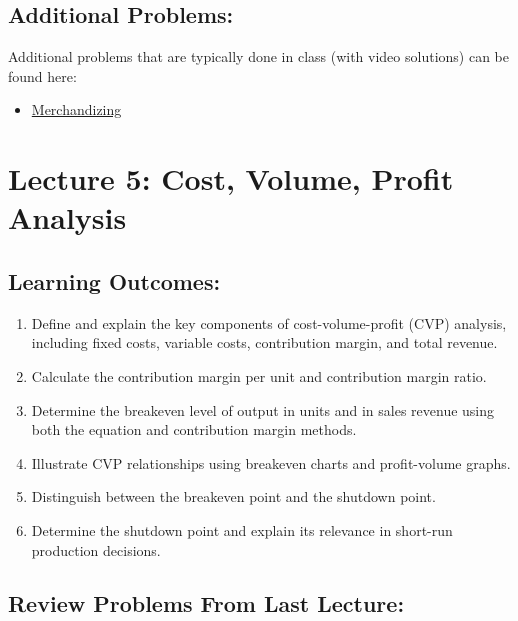 \documentclass[
]{book}
\providecommand{\tightlist}{%
  \setlength{\itemsep}{0pt}\setlength{\parskip}{0pt}}
\begin{document}
\subsection*{Additional Problems:}\label{additional-problems-3}

Additional problems that are typically done in class (with video solutions) can be found here:

\begin{itemize}
\tightlist
\item
  \href{https://theelementsmath.github.io/M114/business-economics.html\#merchandizing}{Merchandizing}
\end{itemize}

\section*{Lecture 5: Cost, Volume, Profit Analysis}\label{lecture-5-cost-volume-profit-analysis}

\subsection*{Learning Outcomes:}\label{learning-outcomes-4}

\begin{enumerate}
\def\labelenumi{\arabic{enumi}.}
\tightlist
\item
  Define and explain the key components of cost-volume-profit (CVP) analysis, including fixed costs, variable costs, contribution margin, and total revenue.
\item
  Calculate the contribution margin per unit and contribution margin ratio.
\item
  Determine the breakeven level of output in units and in sales revenue using both the equation and contribution margin methods.
\item
  Illustrate CVP relationships using breakeven charts and profit-volume graphs.
\item
  Distinguish between the breakeven point and the shutdown point.
\item
  Determine the shutdown point and explain its relevance in short-run production decisions.
\end{enumerate}

\subsection*{Review Problems From Last Lecture:}\label{review-problems-from-last-lecture-3}
\end{document}
